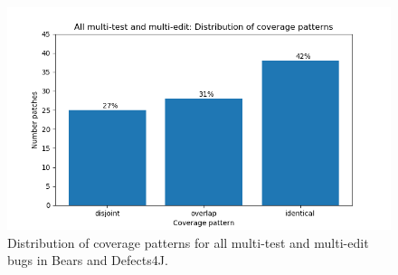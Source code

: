 \begin{figure}
	\includegraphics[width=\linewidth]{img/coverage-all.png}
	\caption{Distribution of coverage patterns for all multi-test and 
	multi-edit bugs in Bears and Defects4J.}
	\label{fig:coverage-all}
\end{figure}


